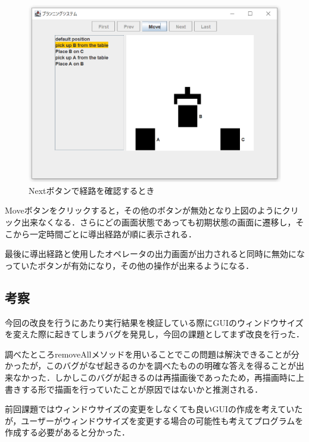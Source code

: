 \documentclass[12pt]{jarticle}
\begin{document}
\begin{figure}[htbp]
  \begin{center}
    \includegraphics[scale=0.8]{images/Move.PNG}
    \caption{Nextボタンで経路を確認するとき}
    \label{fig:Move}
  \end{center}
\end{figure}
Moveボタンをクリックすると，その他のボタンが無効となり上図のようにクリック出来なくなる．さらにどの画面状態であっても初期状態の画面に遷移し，そこから一定時間ごとに導出経路が順に表示される．\par
最後に導出経路と使用したオペレータの出力画面が出力されると同時に無効になっていたボタンが有効になり，その他の操作が出来るようになる．

\clearpage
\subsection{考察}
今回の改良を行うにあたり実行結果を検証している際にGUIのウィンドウサイズを変えた際に起きてしまうバグを発見し，今回の課題としてまず改良を行った．\par
調べたところremoveAllメソッドを用いることでこの問題は解決できることが分かったが，このバグがなぜ起きるのかを調べたものの明確な答えを得ることが出来なかった．しかしこのバグが起きるのは再描画後であったため，再描画時に上書きする形で描画を行っていたことが原因ではないかと推測される．\par
前回課題ではウィンドウサイズの変更をしなくても良いGUIの作成を考えていたが，ユーザーがウィンドウサイズを変更する場合の可能性も考えてプログラムを作成する必要があると分かった．\\
\end{document}

